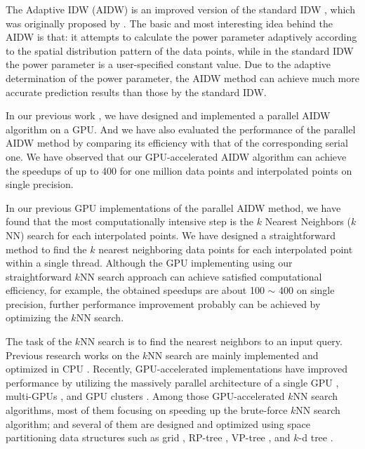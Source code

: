 \documentclass[final,5p,times,twocolumn,authoryear]{elsarticle}
\begin{document}
The Adaptive IDW (AIDW) is an improved version of the standard IDW \citep{01Shepard:1968:TIF:800186.810616}, which was originally proposed by \cite{28DBLP:journals/gandc/LuW08}. 
The basic and most interesting idea behind the AIDW is that: it attempts to 
calculate the power parameter adaptively according to the spatial 
distribution pattern of the data points, while in the standard IDW the power 
parameter is a user-specified constant value. Due to the adaptive 
determination of the power parameter, the AIDW method can achieve much more 
accurate prediction results than those by the standard IDW. 

In our previous work \citep{29DBLP:journals/corr/MeiXX15}, we have designed and implemented a parallel AIDW 
algorithm on a GPU. And we have also evaluated the performance of the 
parallel AIDW method by comparing its efficiency with that of the 
corresponding serial one. We have observed that our GPU-accelerated AIDW 
algorithm can achieve the speedups of up to 400 for one million data points 
and interpolated points on single precision.

In our previous GPU implementations of the parallel AIDW method, we have 
found that the most computationally intensive step is the $k$ Nearest Neighbors 
($k$NN) search for each interpolated points. We have designed a straightforward 
method to find the $k$ nearest neighboring data points for each interpolated 
point within a single thread. Although the GPU implementing using our 
straightforward $k$NN search approach can achieve satisfied computational 
efficiency, for example, the obtained speedups are about 100 $\sim $ 400 on 
single precision, further performance improvement probably can be achieved by 
optimizing the $k$NN search. 

The task of the $k$NN search is to find the nearest neighbors to an input 
query. Previous research works on the $k$NN search are mainly implemented and 
optimized in CPU \citep{n01DBLP:journals/cg/SankaranarayananSV07}. Recently, GPU-accelerated implementations 
have improved performance by utilizing the massively parallel architecture 
of a single GPU \citep{n02DBLP:conf/cvpr/GarciaDB08,n03DBLP:journals/ijpp/LeiteTFRTK12,n04DBLP:conf/icde/PanM12,n05Liang5382329,06DBLP:journals/gandc/HuangY11, n07DBLP:journals/prl/BeliakovL12, n08DBLP:journals/corr/KomarovDD13, n09DBLP:journals/prl/LiuW15}, multi-GPUs \citep{n10DBLP:journals/concurrency/KatoH12,n11arefin2012gpu}, and GPU clusters \citep{n12}. 
Among those GPU-accelerated $k$NN search algorithms, most of them focusing on 
speeding up the brute-force $k$NN search algorithm; and several of them are 
designed and optimized using space partitioning data structures such as grid 
\citep{n03DBLP:journals/ijpp/LeiteTFRTK12}, RP-tree \citep{n04DBLP:conf/icde/PanM12}, VP-tree 
\citep{n09DBLP:journals/prl/LiuW15}, and $k$-d tree \citep{n07DBLP:journals/prl/BeliakovL12}. 
\end{document}
